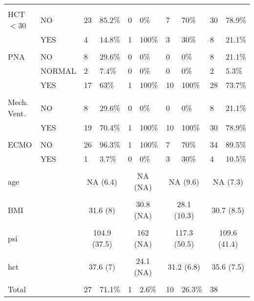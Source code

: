 \documentclass{article}\usepackage[]{graphicx}\usepackage[]{color}
\begin{document}
\begin{table}[ht]
\begin{tabular}{llllllllll}
   &  &  &  &  &  &  &  &  &  \\ 
  HCT$<$30 & NO & 23 & 85.2\% & 0 & 0\% & 7 & 70\% & 30 & 78.9\% \\ 
   & YES & 4 & 14.8\% & 1 & 100\% & 3 & 30\% & 8 & 21.1\% \\ 
   &  &  &  &  &  &  &  &  &  \\ 
  PNA & NO & 8 & 29.6\% & 0 & 0\% & 0 & 0\% & 8 & 21.1\% \\ 
   & NORMAL & 2 & 7.4\% & 0 & 0\% & 0 & 0\% & 2 & 5.3\% \\ 
   & YES & 17 & 63\% & 1 & 100\% & 10 & 100\% & 28 & 73.7\% \\ 
   &  &  &  &  &  &  &  &  &  \\ 
  Mech. Vent. & NO & 8 & 29.6\% & 0 & 0\% & 0 & 0\% & 8 & 21.1\% \\ 
   & YES & 19 & 70.4\% & 1 & 100\% & 10 & 100\% & 30 & 78.9\% \\ 
   &  &  &  &  &  &  &  &  &  \\ 
  ECMO & NO & 26 & 96.3\% & 1 & 100\% & 7 & 70\% & 34 & 89.5\% \\ 
   & YES & 1 & 3.7\% & 0 & 0\% & 3 & 30\% & 4 & 10.5\% \\ 
   &  &  &  &  &  &  &  &  &  \\ 
  
age &  & \multicolumn{2}{c}{NA (6.4)} & \multicolumn{2}{c}{NA (NA)} & \multicolumn{2}{c}{NA (9.6)} & \multicolumn{2}{c}{NA (7.3)}\\
 &  &  &  &  &  &  &  &  & \\
BMI &  & \multicolumn{2}{c}{31.6 (8)} & \multicolumn{2}{c}{30.8 (NA)} & \multicolumn{2}{c}{28.1 (10.3)} & \multicolumn{2}{c}{30.7 (8.5)}\\
 &  &  &  &  &  &  &  &  & \\
psi &  & \multicolumn{2}{c}{104.9 (37.5)} & \multicolumn{2}{c}{162 (NA)} & \multicolumn{2}{c}{117.3 (50.5)} & \multicolumn{2}{c}{109.6 (41.4)}\\
 &  &  &  &  &  &  &  &  & \\
hct &  & \multicolumn{2}{c}{37.6 (7)} & \multicolumn{2}{c}{24.1 (NA)} & \multicolumn{2}{c}{31.2 (6.8)} & \multicolumn{2}{c}{35.6 (7.5)}\\
 &  &  &  &  &  &  &  &  & \\
  \hline
Total &  & 27 & 71.1\% & 1 & 2.6\% & 10 & 26.3\% & 38 &  \\ 
   \hline

\end{tabular}


\end{table}
                                                   
\end{document}
